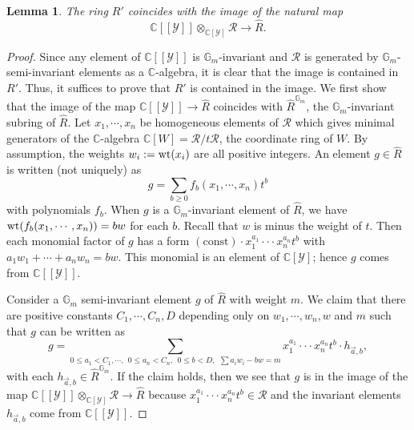 \documentclass[12pt,a4paper]{amsart}
\newtheorem{Lem}[Thm]{Lemma}
\theoremstyle{remark}
\theoremstyle{definition}
\def\C{\mathbb{C}}
\def\G{\mathbb{G}}
\begin{document}
\begin{Lem}\label{Lem1}
The ring $R'$ coincides with the image of the natural map 
$$\C[[\mathcal{Y}]] \otimes_{\C[\mathcal{Y}]} \mathcal{R} \to \hat{R}.$$
\end{Lem}

\begin{proof} Since any element of 
$\C[[\mathcal{Y}]]$ is $\G_m$-invariant and 
$\mathcal{R}$ is generated by $\G_m$-semi-invariant elements as 
a $\C$-algebra, 
it is clear that the image is contained in $R'$. 
Thus, it suffices to prove that $R'$ is contained in the image. 
We first show that the image of the map $\C[[\mathcal{Y}]] \to \hat{R}$ coincides with $\hat{R}^{\G_m}$, 
the $\G_m$-invariant subring 
of $\hat{R}$. 
Let $x_1, \cdots,  x_n$ be homogeneous elements of $\mathcal{R}$ which gives minimal generators of the $\C$-algebra 
$\C[W] = \mathcal{R}/t\mathcal{R}$, 
the coordinate ring of $W$. 
By assumption, the weights $w_i := {\rm wt}(x_i)$ are all positive integers. 
An element $g \in \hat{R}$ is written (not uniquely) as $$g = \sum_{b \geq 0}f_b(x_1, \cdots , x_n)t^b$$ with polynomials $f_b$. 
When $g$ is a $\G_m$-invariant element of $\hat{R}$, we have ${\rm wt}(f_b(x_1, \cdots, x_n)) = bw $ for each $b$. 
Recall that $w$ is 
minus the weight of $t$. 
Then each monomial factor of $g$ has a form $(\mathrm{const})\cdot x_1^{a_1}\cdot\cdot\cdot x_n^{a_n}t^b$ with 
$a_1w_1 + \cdots  + a_nw_n = bw$. This monomial is an element of $\C[\mathcal{Y}]$; hence $g$ comes from $\C[[\mathcal{Y}]]$. 
        
Consider a $\G_m$ semi-invariant element $g$ of $\hat{R}$ 
with weight $m$. We claim that there are positive constants $C_1,\cdots, C_n, D$ depending only on  
$w_1, \cdots, w_n, w$ and $m$ such that $g$ can be written as 
$$g = \sum_{0 \leq a_1 < C_1,  \cdots ,\:\: 0 \leq a_n < C_n,\:\:  0 \leq b < D, \:\: \sum a_iw_i - bw = m}x_1^{a_1}\cdot\cdot\cdot x_n^{a_n}t^b\cdot h_{\vec{a},b}, 
$$
with each $h_{\vec{a},b}\in \hat{R}^{\G_m}$. 
If the claim holds, then we see that $g$ is in the image of the map $\C [[\mathcal{Y}]]\otimes_{\C[\mathcal{Y}]}\mathcal{R} 
\to \hat{R}$ because $x_1^{a_1}\cdot\cdot\cdot x_n^{a_n}t^b \in \mathcal{R}$ and the invariant elements 
$h_{\vec{a},b}$
come from $\C[[\mathcal{Y}]]$. 


\end{proof}
\end{document}
